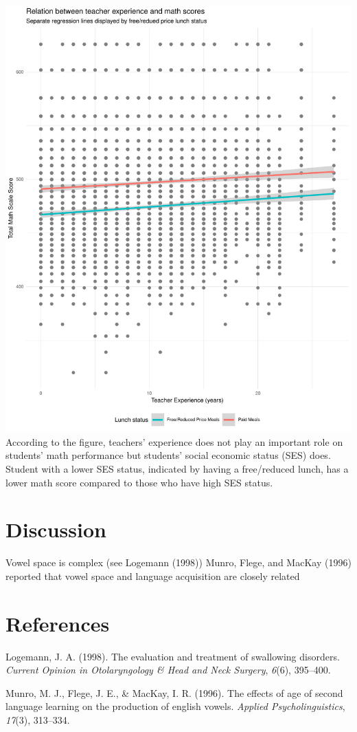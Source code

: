 \documentclass[man]{apa6}
\begin{document}
\includegraphics{Test_files/figure-latex/figure-1.pdf} According to the
figure, teachers' experience does not play an important role on
students' math performance but students' social economic status (SES)
does. Student with a lower SES status, indicated by having a
free/reduced lunch, has a lower math score compared to those who have
high SES status.

\section{Discussion}\label{discussion}

Vowel space is complex (see Logemann (1998)) Munro, Flege, and MacKay
(1996) reported that vowel space and language acquisition are closely
related

\newpage

\section{References}\label{references}

\begingroup
\setlength{\parindent}{-0.5in} \setlength{\leftskip}{0.5in}

\hypertarget{refs}{}
\hypertarget{ref-logemann1998evaluation}{}
Logemann, J. A. (1998). The evaluation and treatment of swallowing
disorders. \emph{Current Opinion in Otolaryngology \& Head and Neck
Surgery}, \emph{6}(6), 395--400.

\hypertarget{ref-munro1996effects}{}
Munro, M. J., Flege, J. E., \& MacKay, I. R. (1996). The effects of age
of second language learning on the production of english vowels.
\emph{Applied Psycholinguistics}, \emph{17}(3), 313--334.

\endgroup
\end{document}
